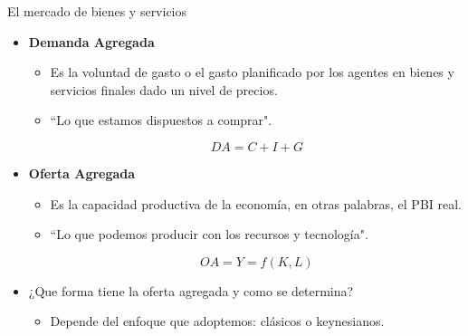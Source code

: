 \documentclass{beamer}
\begin{document}
\begin{frame}{El mercado de bienes y servicios}
\begin{itemize}
    \item \textcolor{blue!80!black}{\textbf{Demanda Agregada}}     {\textcolor{blue!80!black}{\faCartPlus}} \\ \vspace{1mm}
    \begin{itemize}
    \item Es la voluntad de gasto o el gasto planificado por los agentes en bienes y servicios finales dado un nivel de precios.
    \item ``Lo que estamos dispuestos a comprar". 
            \begin{center}
            \begin{tcolorbox}[width=3in, boxsep=0pt, left=0pt, right=0pt, top=2pt, ,colframe = blue!70!black, colback = blue!7!white]%
                    $$ DA = C + I + G $$
             \end{tcolorbox}
             \end{center}
    \end{itemize} \vspace{2mm}
    \item \textcolor{blue!80!black}{\textbf{Oferta Agregada}}     {\textcolor{blue!80!black}{\faCogs}} \vspace{1mm}
    \begin{itemize}
    \item Es la capacidad productiva de la economía, en otras palabras, el PBI real. \vspace{1mm}
    \item ``Lo que podemos producir con los recursos y tecnología". 
        \begin{center}
            \begin{tcolorbox}[width=2in, boxsep=0pt, left=0pt, right=0pt, top=2pt, ,colframe = blue!70!black, colback = blue!7!white]%
                    $$ OA = Y =f(K,L)$$
            \end{tcolorbox}
        \end{center}
    \end{itemize}
\end{itemize}

\vspace{2mm}
\begin{itemize}
    \item ¿Que forma tiene la oferta agregada y como se determina?
    \begin{itemize}
    \item Depende del enfoque que adoptemos: clásicos o keynesianos.
    \end{itemize}
\end{itemize}
\end{frame}
\end{document}
